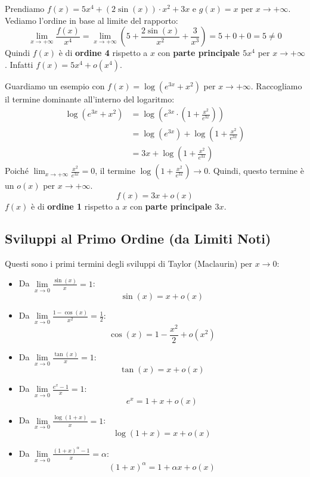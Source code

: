 \begin{example}
    Prendiamo $f(x) = 5x^4 + (2\sin(x)) \cdot x^2 + 3x$ e $g(x) = x$ per $x\to +\infty$.
    Vediamo l'ordine in base al limite del rapporto:
    $$ \lim_{x\to +\infty} \frac{f(x)}{x^4} = \lim_{x\to +\infty} \left( 5 + \frac{2\sin(x)}{x^2} + \frac{3}{x^3} \right) = 5 + 0 + 0 = 5 \neq 0 $$
    Quindi $f(x)$ è di \textbf{ordine 4} rispetto a $x$ con \textbf{parte principale $5x^4$} per $x\to +\infty$.
    Infatti $f(x) = 5x^4 + o(x^4)$.
\end{example}

\begin{example}
    Guardiamo un esempio con $f(x) = \log(e^{3x} + x^2)$ per $x\to +\infty$.
    Raccogliamo il termine dominante all'interno del logaritmo:
    \begin{align*}
        \log(e^{3x} + x^2) &= \log\left(e^{3x} \cdot \left(1 + \frac{x^2}{e^{3x}}\right)\right) \\
        &= \log(e^{3x}) + \log\left(1 + \frac{x^2}{e^{3x}}\right) \\
        &= 3x + \log\left(1 + \frac{x^2}{e^{3x}}\right)
    \end{align*}
    Poiché $\lim_{x\to +\infty} \frac{x^2}{e^{3x}} = 0$, il termine $\log\left(1 + \frac{x^2}{e^{3x}}\right) \to 0$.
    Quindi, questo termine è un $o(x)$ per $x\to +\infty$.
    $$ f(x) = 3x + o(x) $$
    $f(x)$ è di \textbf{ordine 1} rispetto a $x$ con \textbf{parte principale $3x$}.
\end{example}

\subsection{Sviluppi al Primo Ordine (da Limiti Noti)}

Questi sono i primi termini degli sviluppi di Taylor (Maclaurin) per $x\to 0$:
\begin{itemize}
    \item Da $\lim\limits_{x\to 0}\frac{\sin(x)}{x} = 1$:
    $$ \sin(x) = x + o(x) $$
    
    \item Da $\lim\limits_{x\to 0}\frac{1 - \cos(x)}{x^2} = \frac{1}{2}$:
    $$ \cos(x) = 1 - \frac{x^2}{2} + o(x^2) $$
    
    \item Da $\lim\limits_{x\to 0}\frac{\tan(x)}{x} = 1$:
    $$ \tan(x) = x + o(x) $$
    
    \item Da $\lim\limits_{x\to 0}\frac{e^x - 1}{x} = 1$:
    $$ e^x = 1 + x + o(x) $$
    
    \item Da $\lim\limits_{x\to 0} \frac{\log(1 + x)}{x} = 1$:
    $$ \log(1 + x) = x + o(x) $$
    
    \item Da $\lim\limits_{x\to 0} \frac{(1+x)^\alpha - 1}{x} = \alpha$:
    $$ (1+x)^\alpha = 1 + \alpha x + o(x) $$
\end{itemize}

